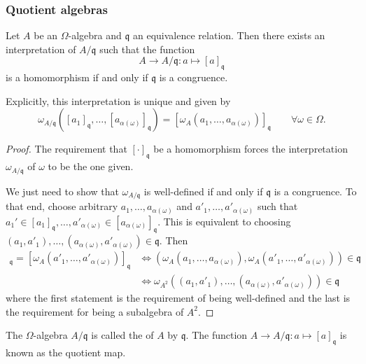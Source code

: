 \subsubsection{Quotient algebras}
\begin{proposition} \label{quotientAlgebra}
Let $A$ be an $\Omega$-algebra and $\mathfrak{q}$ an equivalence relation. Then there exists an interpretation of $A/\mathfrak{q}$ such that the function
\[ A \to A/\mathfrak{q}: a\mapsto [a]_\mathfrak{q} \]
is a homomorphism if and only if $\mathfrak{q}$ is a congruence.

Explicitly, this interpretation is unique and given by
\[ \omega_{A/\mathfrak{q}}([a_1]_{\mathfrak{q}},\ldots,[a_{\alpha(\omega)}]_{\mathfrak{q}}) = [\omega_A(a_1,\ldots, a_{\alpha(\omega)})]_{\mathfrak{q}} \qquad \forall \omega\in\Omega. \]\end{proposition}
\begin{proof}
The requirement that $[\cdot]_\mathfrak{q}$ be a homomorphism forces the interpretation $\omega_{A/\mathfrak{q}}$ of $\omega$ to be the one given.

We just need to show that $\omega_{A/\mathfrak{q}}$ is well-defined if and only if $\mathfrak{q}$ is a congruence. To that end, choose arbitrary $a_1, \ldots, a_{\alpha(\omega)}$ and $a'_1, \ldots, a'_{\alpha(\omega)}$ such that $a_1'\in[a_1]_\mathfrak{q}, \ldots, a'_{\alpha(\omega)}\in [a_{\alpha(\omega)}]_\mathfrak{q}$. This is equivalent to choosing $(a_1,a'_1),\ldots, (a_{\alpha(\omega)},a'_{\alpha(\omega)}) \in \mathfrak{q}$. Then
\begin{align*}
[\omega_A(a_1,\ldots, a_{\alpha(\omega)})]_{\mathfrak{q}} = [\omega_A(a'_1,\ldots, a'_{\alpha(\omega)})]_{\mathfrak{q}} &\iff (\omega_A(a_1,\ldots, a_{\alpha(\omega)}),\omega_A(a'_1,\ldots, a'_{\alpha(\omega)})) \in \mathfrak{q} \\
&\iff \omega_{A^2}((a_1,a'_1),\ldots, (a_{\alpha(\omega)},a'_{\alpha(\omega)})) \in \mathfrak{q}
\end{align*}
where the first statement is the requirement of being well-defined and the last is the requirement for being a subalgebra of $A^2$.
\end{proof}
\begin{definition}
The $\Omega$-algebra $A/\mathfrak{q}$ is called the  of $A$ by $\mathfrak{q}$. The function $A \to A/\mathfrak{q}: a\mapsto [a]_\mathfrak{q}$ is known as the quotient map.
\end{definition}

